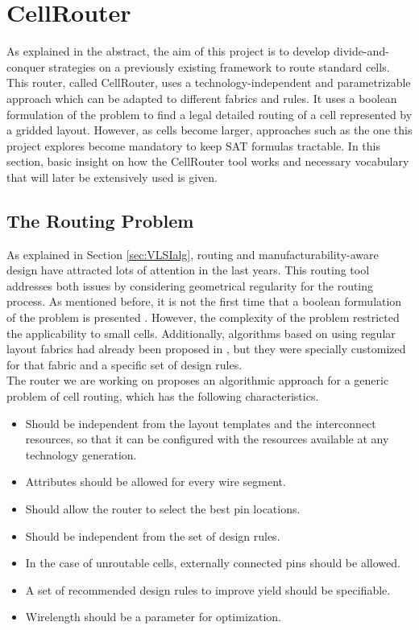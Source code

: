 \chapter{CellRouter}
\label{cha:cellrouter}

As explained in the abstract, the aim of this project is to develop divide-and-conquer strategies on a previously existing framework to route standard cells. This router, called CellRouter, uses a technology-independent and parametrizable approach which can be adapted to different fabrics and rules. It uses a boolean formulation of the problem to find a legal detailed routing of a cell represented by a gridded layout. However, as cells become larger, approaches such as the one this project explores become mandatory to keep SAT formulas tractable. In this section, basic insight on how the CellRouter tool works and necessary vocabulary that will later be extensively used is given.\\


\section{The Routing Problem}

As explained in Section \ref{sec:VLSIalg}, routing and manufacturability-aware design have attracted lots of attention in the last years. This routing tool addresses both issues by considering geometrical regularity for the routing process. As mentioned before, it is not the first time that a boolean formulation of the problem is presented \cite{set,vuit}. However, the complexity of the problem restricted the applicability to small cells. Additionally, algorithms based on using regular layout fabrics had already been proposed in \cite{cinc}, but they were specially customized for that fabric and a specific set of design rules. \\

The router we are working on proposes an algorithmic approach for a generic problem of cell routing, which has the following characteristics.

\begin{itemize}
  \item Should be independent from the layout templates and the interconnect resources, so that it can be configured with the resources available at any technology generation.
  \item Attributes should be allowed for every wire segment.
  \item Should allow the router to select the best pin locations.
  \item Should be independent from the set of design rules.
  \item In the case of unroutable cells, externally connected pins should be allowed.
  \item A set of recommended design rules to improve yield should be specifiable.
  \item Wirelength should be a parameter for optimization. \\
\end{itemize} 

